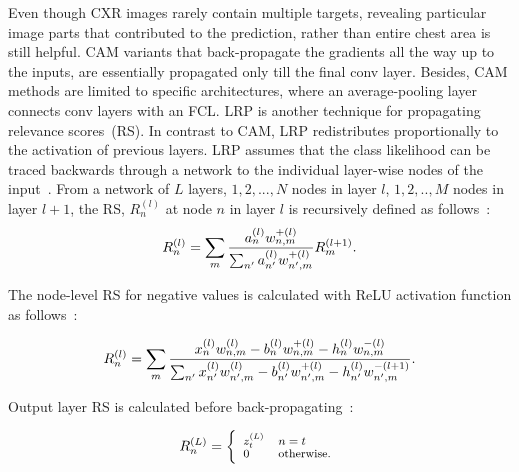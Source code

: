 \documentclass[conference]{IEEEtran}
\begin{document}
Even though CXR images rarely contain multiple targets, revealing particular image parts that contributed to the prediction, rather than entire chest area is still helpful. CAM variants that back-propagate the gradients all the way up to the inputs, are essentially propagated only till the final conv layer. Besides, CAM methods are limited to specific architectures, where an average-pooling layer connects conv layers with an FCL. LRP is another technique for propagating relevance scores~(RS). In contrast to CAM, LRP redistributes proportionally to the activation of previous layers. LRP assumes that the class likelihood can be traced backwards through a network to the individual layer-wise nodes of the input~\cite{LRP2}. From a network of $L$ layers, $1,2,...,N$ nodes in layer $l$, $1,2,..,M$ nodes in layer $l+1$, the RS, $R_{n}^{(l)}$ at node $n$ in layer $l$ is recursively defined as follows~\cite{LRP2}:   
\begin{equation}
\scriptsize{
    R_{n}^{(l)}=\sum_{m} \frac{a_{n}^{(l)} w_{n, m}^{+(l)}}{\sum_{n^{\prime}} a_{n^{\prime}}^{(l)} w_{n^{\prime}, m}^{+(l)}} R_{m}^{(l+1)}.}
\end{equation}
\vspace{-2mm}

The node-level RS for negative values is calculated with ReLU activation function as follows~\cite{LRP2}:

\vspace{-2mm}
\begin{equation}
\scriptsize{
    R_{n}^{(l)}=\sum_{m} \frac{x_{n}^{(l)} w_{n, m}^{(l)}-b_{n}^{(l)} w_{n, m}^{+(l)}-h_{n}^{(l)} w_{n, m}^{-(l)}}{\sum_{n^{\prime}} x_{n^{\prime}}^{(l)} w_{n^{\prime}, m}^{(l)}-b_{n^{\prime}}^{(l)} w_{n^{\prime}, m}^{+(l)}-h_{n^{\prime}}^{(l)} w_{n^{\prime}, m}^{-(l+1)}}.}
\end{equation}
\vspace{-2mm}

\noindent Output layer RS is calculated before  back-propagating~\cite{LRP2}:

\vspace{-2mm}
\begin{equation}
\scriptsize{
    R_{n}^{(L)}=\left\{\begin{array}{ll}
    {z_{t}^{(L)}} & {n=t} \\
    {0} & {\text {otherwise.}}
    \end{array}\right.}
\end{equation}
\vspace{-2mm}
\end{document}
